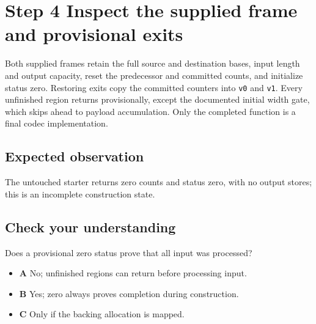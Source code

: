 \section{Step 4 Inspect the supplied frame and provisional exits}\label{delta-s04}

Both supplied frames retain the full source and destination bases, input length and output capacity, reset the predecessor and committed counts, and initialize status zero. Restoring exits copy the committed counters into \texttt{v0} and \texttt{v1}. Every unfinished region returns provisionally, except the documented initial width gate, which skips ahead to payload accumulation. Only the completed function is a final codec implementation.

\subsection{Expected observation}
The untouched starter returns zero counts and status zero, with no output stores; this is an incomplete construction state.

\subsection{Check your understanding}
Does a provisional zero status prove that all input was processed?

\begin{itemize}
  \item \textbf{A} No; unfinished regions can return before processing input.
  \item \textbf{B} Yes; zero always proves completion during construction.
  \item \textbf{C} Only if the backing allocation is mapped.
\end{itemize}
